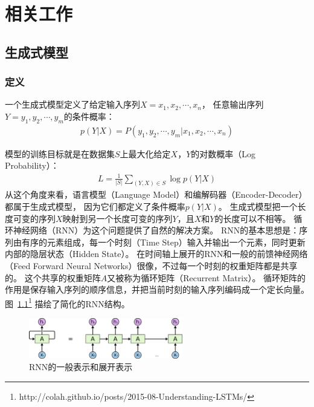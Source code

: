 
\chapter{相关工作}\label{ch:related_work}
\section{生成式模型}\label{sec:generative_model}
\subsection{定义}\label{subsec:definition}
一个生成式模型定义了给定输入序列$X = x_1, x_2, \cdots, x_n$，
任意输出序列$Y = y_1, y_2, \cdots, y_m$的条件概率：
\begin{align}
    p(Y|X) = P(y_1, y_2, \cdots, y_m|x_1, x_2, \cdots, x_n)
    \label{eqn:generative_conditional_probability}
\end{align}

模型的训练目标就是在数据集$S$上最大化给定$X$，$Y$的对数概率（Log Probability）：
\begin{align}
    \mathit{L} = \frac{1}{|S|} \sum_{(Y, X) \in S} \log p(Y|X)
\end{align}
从这个角度来看，语言模型（Language Model）和编解码器（Encoder-Decoder）都属于生成式模型，
因为它们都定义了条件概率$p(Y|X)$。
生成式模型把一个长度可变的序列$X$映射到另一个长度可变的序列$Y$，且$X$和$Y$的长度可以不相等。
循环神经网络（RNN）为这个问题提供了自然的解决方案。
RNN的基本思想是：序列由有序的元素组成，每一个时刻（Time Step）输入并输出一个元素，同时更新内部的隐层状态（Hidden State）。
在时间轴上展开的RNN和一般的前馈神经网络（Feed Forward Neural Networks）很像，不过每一个时刻的权重矩阵都是共享的。
这个共享的权重矩阵$A$又被称为循环矩阵（Recurrent Matrix）。
循环矩阵的作用是保存输入序列的顺序信息，并把当前时刻的输入序列编码成一个定长向量。
图~\ref{fig:RNN_unrolled}\footnote{http://colah.github.io/posts/2015-08-Understanding-LSTMs/}
描绘了简化的RNN结构。
\begin{figure}[H]
    \centering
    \includegraphics[width=0.6\textwidth]{figure/RNN-unrolled.png}
    \caption{RNN的一般表示和展开表示}
    \label{fig:RNN_unrolled}
\end{figure}

